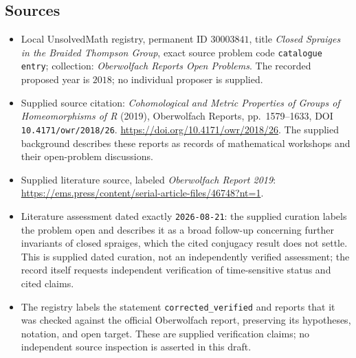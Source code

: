 \documentclass[11pt]{article}
\begin{document}
\subsection{Sources}
\begin{itemize}
\item Local UnsolvedMath registry, permanent ID \(30003841\), title \emph{Closed Spraiges in the Braided Thompson Group}, exact source problem code \texttt{catalogue entry}; collection: \emph{Oberwolfach Reports Open Problems}. The recorded proposed year is \(2018\); no individual proposer is supplied.
\item Supplied source citation: \emph{Cohomological and Metric Properties of Groups of Homeomorphisms of R} (2019), Oberwolfach Reports, pp.\ 1579--1633, DOI \texttt{10.4171/owr/2018/26}. \url{https://doi.org/10.4171/owr/2018/26}. The supplied background describes these reports as records of mathematical workshops and their open-problem discussions.
\item Supplied literature source, labeled \emph{Oberwolfach Report 2019}: \url{https://ems.press/content/serial-article-files/46748?nt=1}.
\item Literature assessment dated exactly \texttt{2026-08-21}: the supplied curation labels the problem open and describes it as a broad follow-up concerning further invariants of closed spraiges, which the cited conjugacy result does not settle. This is supplied dated curation, not an independently verified assessment; the record itself requests independent verification of time-sensitive status and cited claims.
\item The registry labels the statement \texttt{corrected\_verified} and reports that it was checked against the official Oberwolfach report, preserving its hypotheses, notation, and open target. These are supplied verification claims; no independent source inspection is asserted in this draft.
\end{itemize}
\end{document}
